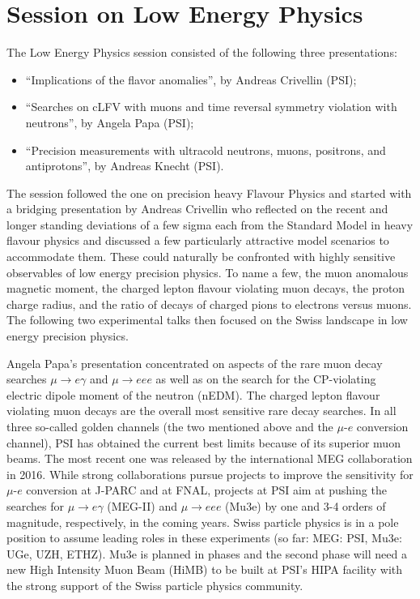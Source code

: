 \section{Session on Low Energy Physics}\label{lowenergy}

 

The Low Energy Physics session consisted of the following three  presentations:
\begin{itemize} \setlength{\itemsep}{-1ex}
\item ``Implications of the flavor anomalies'', by  Andreas Crivellin (PSI);
\item ``Searches on cLFV with muons and time reversal symmetry violation with
neutrons'', by Angela Papa (PSI);
\item ``Precision measurements with ultracold
neutrons, muons, positrons, and antiprotons'', by Andreas Knecht (PSI).
\end{itemize}

The session followed the one on precision heavy Flavour Physics and
started with a bridging presentation by Andreas Crivellin who
reflected on the recent and longer standing deviations of a few sigma
each from the Standard Model in heavy flavour physics and discussed a
few particularly attractive model scenarios to accommodate them. These
could naturally be confronted with highly sensitive observables of low
energy precision physics. To name a few, the muon anomalous magnetic
moment, the charged lepton flavour violating muon decays, the proton
charge radius, and the ratio of decays of charged pions to electrons
versus muons. The following two experimental talks then focused on the
Swiss landscape in low energy precision physics.

Angela Papa's presentation concentrated on aspects of the rare muon
decay searches $\mu\to e \gamma$ and $\mu\to eee$ as well as on the
search for the CP-violating electric dipole moment of the neutron
(nEDM).  The charged lepton flavour violating muon decays are the
overall most sensitive rare decay searches. 
In all three so-called golden channels (the two
mentioned above and the $\mu$-$e$ conversion channel), 
PSI has obtained the current best limits because of its superior muon beams. 
The most recent one was released by the international MEG
collaboration in 2016. While strong collaborations pursue projects to
improve the sensitivity for $\mu$-$e$ conversion at J-PARC and at
FNAL, projects at PSI aim at pushing the searches for $\mu\to e
\gamma$ (MEG-II) and $\mu\to eee$ (Mu3e) by one and 3-4 orders of
magnitude, respectively, in the coming years. Swiss particle physics is
in a pole position to assume leading roles in these experiments (so
far: MEG: PSI, Mu3e: UGe, UZH, ETHZ). Mu3e is planned in phases
and the second phase will need a new High Intensity Muon Beam (HiMB)
to be built at PSI's HIPA facility with the strong support of the Swiss
particle physics community.

